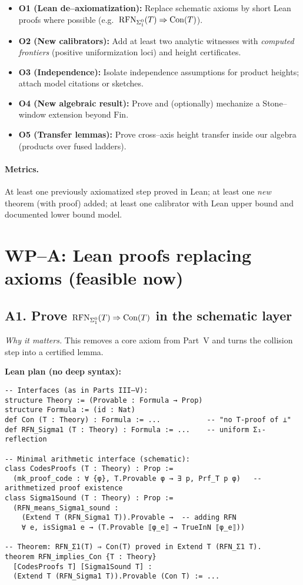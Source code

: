 \documentclass[11pt]{article}
\theoremstyle{definition}
\theoremstyle{remark}
\begin{document}
\begin{itemize}
\item \textbf{O1 (Lean de–axiomatization):} Replace schematic axioms by short Lean proofs where possible (e.g.\ $\mathrm{RFN}_{\Sigma^0_1}(T)\Rightarrow \mathrm{Con}(T)$).
\item \textbf{O2 (New calibrators):} Add at least two analytic witnesses with \emph{computed frontiers} (positive uniformization loci) and height certificates.
\item \textbf{O3 (Independence):} Isolate independence assumptions for product heights; attach model citations or sketches.
\item \textbf{O4 (New algebraic result):} Prove and (optionally) mechanize a Stone--window extension beyond $\mathrm{Fin}$.
\item \textbf{O5 (Transfer lemmas):} Prove cross–axis height transfer inside our algebra (products over fused ladders).
\end{itemize}

\paragraph{Metrics.}
At least one previously axiomatized step proved in Lean; at least one \emph{new} theorem (with proof) added; at least one calibrator with Lean upper bound and documented lower bound model.

\section{WP–A: Lean proofs replacing axioms (feasible now)}

\subsection{A1. Prove $\mathrm{RFN}_{\Sigma^0_1}(T)\Rightarrow \mathrm{Con}(T)$ in the schematic layer}
\emph{Why it matters.} This removes a core axiom from Part~V and turns the collision step into a certified lemma.

\medskip\noindent
\textbf{Lean plan (no deep syntax):}
\begin{verbatim}
-- Interfaces (as in Parts III–V):
structure Theory := (Provable : Formula → Prop)
structure Formula := (id : Nat)
def Con (T : Theory) : Formula := ...           -- "no T-proof of ⊥"
def RFN_Sigma1 (T : Theory) : Formula := ...    -- uniform Σ₁-reflection

-- Minimal arithmetic interface (schematic):
class CodesProofs (T : Theory) : Prop :=
  (mk_proof_code : ∀ {φ}, T.Provable φ → ∃ p, Prf_T p φ)   -- arithmetized proof existence
class Sigma1Sound (T : Theory) : Prop :=
  (RFN_means_Sigma1_sound :
    (Extend T (RFN_Sigma1 T)).Provable →  -- adding RFN
    ∀ e, isSigma1 e → (T.Provable ⟦φ_e⟧ → TrueInN ⟦φ_e⟧))

-- Theorem: RFN_Σ1(T) ⇒ Con(T) proved in Extend T (RFN_Σ1 T).
theorem RFN_implies_Con {T : Theory}
  [CodesProofs T] [Sigma1Sound T] :
  (Extend T (RFN_Sigma1 T)).Provable (Con T) := ...
\end{verbatim}
\end{document}
